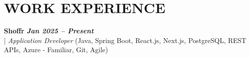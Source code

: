 \documentclass[10pt,a4paper]{article}
\begin{document}

\section*{WORK EXPERIENCE}
\small

\noindent
  \textbf{Shoffr} \hfill \textit{\textbf{Jan 2025 -- Present}} \\
  \;|\;
  \textit{Application Developer} (Java, Spring Boot, React.js, Next.js, PostgreSQL, REST APIs, Azure - Familiar, Git, Agile)
\end{document}
